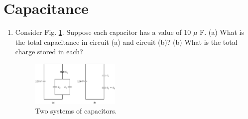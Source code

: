 \documentclass{article}
\begin{document}
\section{Capacitance}

\begin{enumerate}
\item Consider Fig. \ref{fig:caps}.  Suppose each capacitor has a value of 10 $\mu$ F.  (a) What is the total capacitance in circuit (a) and circuit (b)?  (b) What is the total charge stored in each?
\begin{figure}
\centering
\includegraphics[width=0.4\textwidth]{caps.jpeg}
\caption{\label{fig:caps} Two systems of capacitors.}
\end{figure}
\end{enumerate}
\end{document}
